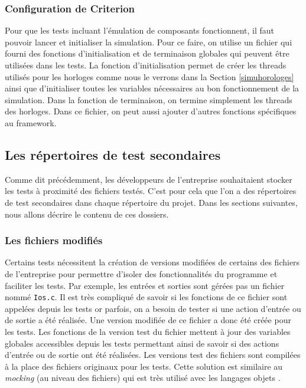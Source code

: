 \documentclass[a4paper]{article}
\begin{document}
\subsubsection*{Configuration de Criterion}
\label{configuration-de-criterion}

Pour que les tests incluant l'émulation de composants fonctionnent, il faut
pouvoir lancer et initialiser la simulation. Pour ce faire, on utilise un
fichier qui fourni des fonctions d'initialisation et de terminaison globales qui
peuvent être utilisées dans les tests. La fonction d'initialisation permet de
créer les threads utilisés pour les horloges comme nous le verrons dans la
Section \ref{simuhorologes} ainsi que d'initialiser toutes les variables
nécessaires au bon fonctionnement de la simulation. Dans la fonction de
terminaison, on termine simplement les threads des horloges. Dans ce fichier, on
peut aussi ajouter d'autres fonctions spécifiques au framework.

\subsection{Les répertoires de test secondaires}

Comme dit précédemment, les développeurs de l'entreprise souhaitaient stocker
les tests à proximité des fichiers testés. C'est pour cela que l'on a des
répertoires de test secondaires dans chaque répertoire du projet. Dans les
sections suivantes, nous allons décrire le contenu de ces dossiers.

\subsubsection{Les fichiers modifiés}

Certains tests nécessitent la création de versions modifiées de certains des
fichiers de l'entreprise pour permettre d'isoler des fonctionnalités du
programme et faciliter les tests. Par exemple, les entrées et sorties sont
gérées pas un fichier nommé \verb|Ios.c|. Il est très compliqué de savoir si les
fonctions de ce fichier sont appelées depuis les tests or parfois, on a besoin
de tester si une action d'entrée ou de sortie a été réalisée. Une version modifiée
de ce fichier a donc été créée pour les tests. Les fonctions de la version test
du fichier mettent à jour des variables globales accessibles depuis les tests
permettant ainsi de savoir si des actions d'entrée ou de sortie ont été
réalisées. Les versions test des fichiers sont compilées à la place des fichiers
originaux pour les tests. Cette solution est similaire au \textit{mocking} (au
niveau des fichiers) qui est très utilisé avec les langages objets
\cite{spadini2017mock}.
\end{document}
